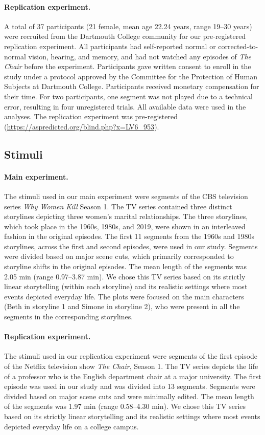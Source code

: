 \documentclass[10pt]{article}
\begin{document}
\paragraph*{Replication experiment.} A total of 37 participants (21 female, mean age 22.24 years, range 19--30 years) were recruited from the Dartmouth College community for our pre-registered replication experiment. All participants had self-reported normal or corrected-to-normal vision, hearing, and memory, and had not watched any episodes of \textit{The Chair} before the experiment. Participants gave written consent to enroll in the study under a protocol approved by the Committee for the Protection of Human Subjects at Dartmouth College. Participants received monetary compensation for their time. For two participants, one segment was not played due to a technical error, resulting in four unregistered trials. All available data were used in the analyses. The replication experiment was pre-registered (\url{https://aspredicted.org/blind.php?x=LV6_953}).

\subsection*{Stimuli}

\paragraph{Main experiment.} The stimuli used in our main experiment were segments of the CBS television series \textit{Why Women Kill} Season 1. The TV series contained three distinct storylines depicting three women’s marital relationships. The three storylines, which took place in the 1960s, 1980s, and 2019, were shown in an interleaved fashion in the original episodes. The first 11 segments from the 1960s and 1980s storylines, across the first and second episodes, were used in our study. Segments were divided based on major scene cuts, which primarily corresponded to storyline shifts in the original episodes. The mean length of the segments was 2.05 min (range 0.97--3.87 min). We chose this TV series based on its strictly linear storytelling (within each storyline) and its realistic settings where most events depicted everyday life. The plots were focused on the main characters (Beth in storyline 1 and Simone in storyline 2), who were present in all the segments in the corresponding storylines.

\paragraph{Replication experiment.} The stimuli used in our replication experiment were segments of the first episode of the Netflix television show \textit{The Chair}, Season 1. The TV series depicts the life of a professor who is the English department chair at a major university. The first episode was used in our study and was divided into 13 segments. Segments were divided based on major scene cuts and were minimally edited. The mean length of the segments was 1.97 min (range 0.58--4.30 min). We chose this TV series based on its strictly linear storytelling and its realistic settings where most events depicted everyday life on a college campus. 
\end{document}

